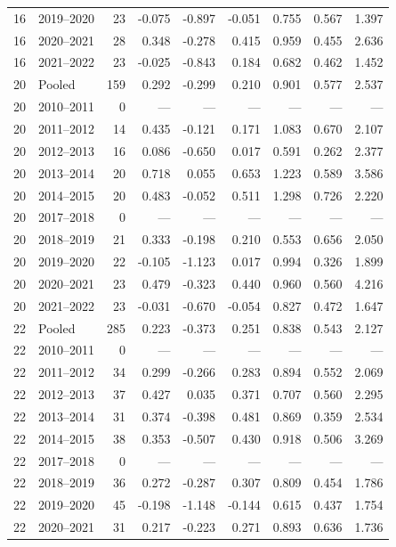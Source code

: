 \begin{longtable}{llrrrrrrr}
16 & 2019--2020 & 23 & -0.075 & -0.897 & -0.051 & 0.755 & 0.567 & 1.397 \\
16 & 2020--2021 & 28 & 0.348 & -0.278 & 0.415 & 0.959 & 0.455 & 2.636 \\
16 & 2021--2022 & 23 & -0.025 & -0.843 & 0.184 & 0.682 & 0.462 & 1.452 \\
20 & Pooled & 159 & 0.292 & -0.299 & 0.210 & 0.901 & 0.577 & 2.537 \\
20 & 2010--2011 & 0 & --- & --- & --- & --- & --- & --- \\
20 & 2011--2012 & 14 & 0.435 & -0.121 & 0.171 & 1.083 & 0.670 & 2.107 \\
20 & 2012--2013 & 16 & 0.086 & -0.650 & 0.017 & 0.591 & 0.262 & 2.377 \\
20 & 2013--2014 & 20 & 0.718 & 0.055 & 0.653 & 1.223 & 0.589 & 3.586 \\
20 & 2014--2015 & 20 & 0.483 & -0.052 & 0.511 & 1.298 & 0.726 & 2.220 \\
20 & 2017--2018 & 0 & --- & --- & --- & --- & --- & --- \\
20 & 2018--2019 & 21 & 0.333 & -0.198 & 0.210 & 0.553 & 0.656 & 2.050 \\
20 & 2019--2020 & 22 & -0.105 & -1.123 & 0.017 & 0.994 & 0.326 & 1.899 \\
20 & 2020--2021 & 23 & 0.479 & -0.323 & 0.440 & 0.960 & 0.560 & 4.216 \\
20 & 2021--2022 & 23 & -0.031 & -0.670 & -0.054 & 0.827 & 0.472 & 1.647 \\
22 & Pooled & 285 & 0.223 & -0.373 & 0.251 & 0.838 & 0.543 & 2.127 \\
22 & 2010--2011 & 0 & --- & --- & --- & --- & --- & --- \\
22 & 2011--2012 & 34 & 0.299 & -0.266 & 0.283 & 0.894 & 0.552 & 2.069 \\
22 & 2012--2013 & 37 & 0.427 & 0.035 & 0.371 & 0.707 & 0.560 & 2.295 \\
22 & 2013--2014 & 31 & 0.374 & -0.398 & 0.481 & 0.869 & 0.359 & 2.534 \\
22 & 2014--2015 & 38 & 0.353 & -0.507 & 0.430 & 0.918 & 0.506 & 3.269 \\
22 & 2017--2018 & 0 & --- & --- & --- & --- & --- & --- \\
22 & 2018--2019 & 36 & 0.272 & -0.287 & 0.307 & 0.809 & 0.454 & 1.786 \\
22 & 2019--2020 & 45 & -0.198 & -1.148 & -0.144 & 0.615 & 0.437 & 1.754 \\
22 & 2020--2021 & 31 & 0.217 & -0.223 & 0.271 & 0.893 & 0.636 & 1.736 \\

\end{longtable}
